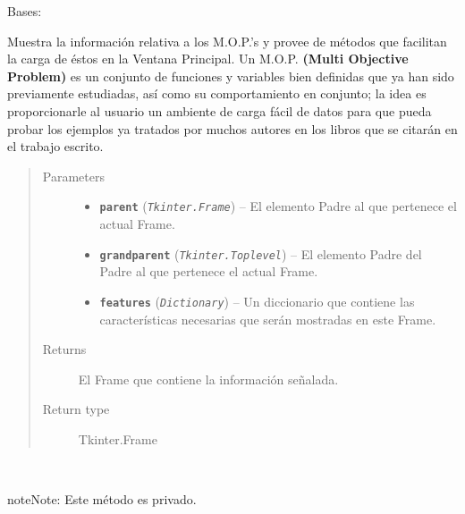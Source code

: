 \documentclass[letterpaper,10pt,english]{sphinxmanual}
\begin{document}
\begin{fulllineitems}
\label{View/Additional/MenuInternalOption/InternalOptionTab/MOPFrame:View.Additional.MenuInternalOption.InternalOptionTab.MOPFrame.MOPFrame}
Bases: 

Muestra la información relativa a los M.O.P.'s y
provee de métodos que facilitan la carga de éstos en la
Ventana Principal.
Un M.O.P. \textbf{(Multi Objective Problem)} es un conjunto de funciones
y variables bien definidas que ya han sido previamente estudiadas,
así como su comportamiento en conjunto; la idea es proporcionarle al
usuario un ambiente de carga fácil de datos para que pueda probar los
ejemplos ya tratados por muchos autores en los libros que se citarán
en el trabajo escrito.
\begin{quote}\begin{description}
\item[{Parameters}] \leavevmode\begin{itemize}
\item {} 
\textbf{\texttt{parent}} (\emph{\texttt{Tkinter.Frame}}) -- El elemento Padre al que pertenece el actual
Frame.

\item {} 
\textbf{\texttt{grandparent}} (\emph{\texttt{Tkinter.Toplevel}}) -- El elemento Padre del Padre al que pertenece el actual
Frame.

\item {} 
\textbf{\texttt{features}} (\emph{\texttt{Dictionary}}) -- Un diccionario que contiene las características necesarias
que serán mostradas en este Frame.

\end{itemize}

\item[{Returns}] \leavevmode
El Frame que contiene la información señalada.

\item[{Return type}] \leavevmode
Tkinter.Frame

\end{description}\end{quote}

\begin{fulllineitems}
\label{View/Additional/MenuInternalOption/InternalOptionTab/MOPFrame:View.Additional.MenuInternalOption.InternalOptionTab.MOPFrame.MOPFrame._MOPFrame__get_mop_example}~
\begin{notice}{note}{Note:}
Este método es privado.
\end{notice}


\end{fulllineitems}
\end{fulllineitems}
\end{document}
